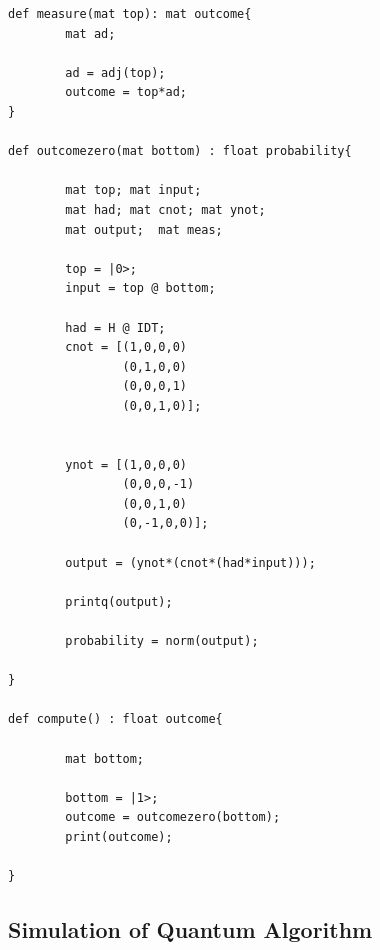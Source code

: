 \begin{lstlisting}
def measure(mat top): mat outcome{
        mat ad;
        
        ad = adj(top);
        outcome = top*ad;
}

def outcomezero(mat bottom) : float probability{
        
        mat top; mat input;
        mat had; mat cnot; mat ynot;
        mat output;  mat meas;
        
        top = |0>;
        input = top @ bottom;
        
        had = H @ IDT;
        cnot = [(1,0,0,0)
                (0,1,0,0)
                (0,0,0,1)
                (0,0,1,0)];
      
        
        ynot = [(1,0,0,0)
                (0,0,0,-1)
                (0,0,1,0)
                (0,-1,0,0)];
    
        output = (ynot*(cnot*(had*input)));
        
        printq(output);
        
        probability = norm(output);
   
}

def compute() : float outcome{
        
        mat bottom;
        
        bottom = |1>;
        outcome = outcomezero(bottom);
        print(outcome);
	
}
\end{lstlisting}

\subsection{ Simulation of Quantum Algorithm}

